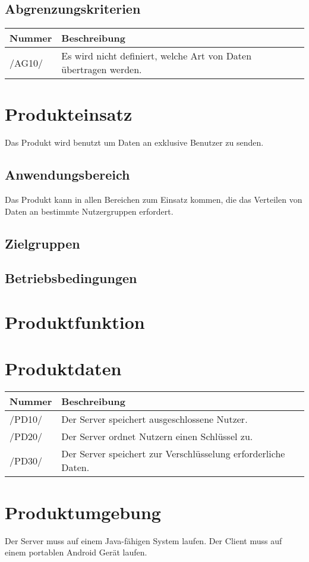 \documentclass[a4paper,10pt]{article}
\newcommand\addrow[2]{#1 &#2\\ }
\newcommand\addheading[2]{#1 &#2\\ \hline}
\newcommand\tabularhead{\begin{tabular}{lp{13cm}}
\hline
}
\newenvironment{usecase}{\tabularhead}
{\hline\end{tabular}}
\begin{document}
\subsection{Abgrenzungskriterien}
\newcommand{\abgrenzungKuerzel}{AG}
\begin{usecase}
\addheading{Nummer}{Beschreibung}
\addrow{/\abgrenzungKuerzel10/} {Es wird nicht definiert, welche Art von Daten übertragen werden.}
\end{usecase}

\section{Produkteinsatz}
Das Produkt wird benutzt um Daten an exklusive Benutzer zu senden.
\subsection{Anwendungsbereich}
Das Produkt kann in allen Bereichen zum Einsatz kommen, die das Verteilen von Daten an bestimmte Nutzergruppen erfordert.
\subsection{Zielgruppen}

\subsection{Betriebsbedingungen}

\section{Produktfunktion}

\section{Produktdaten}
\newcommand{\datenKuerzel}{PD}
\begin{usecase}
\addheading{Nummer}{Beschreibung}
\addrow{/\datenKuerzel10/} {Der Server speichert ausgeschlossene Nutzer.}
\addrow{/\datenKuerzel20/} {Der Server ordnet Nutzern einen Schlüssel zu.}
\addrow{/\datenKuerzel30/} {Der Server speichert zur Verschlüsselung erforderliche Daten.}
\end{usecase}

\section{Produktumgebung}
Der Server muss auf einem Java-fähigen System laufen.
Der Client muss auf einem portablen Android Gerät laufen.
\end{document}
